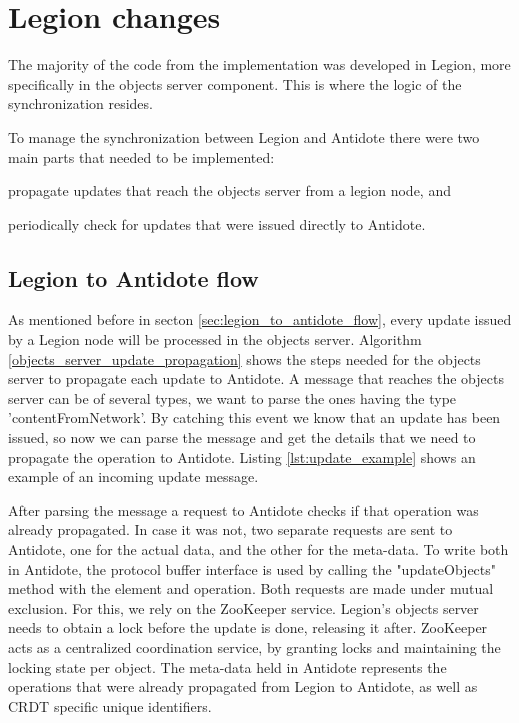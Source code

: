 \section{Legion changes}
\label{sec:legion_changes}
The majority of the code from the implementation was developed in Legion, more specifically in the objects server component. This is where the logic of the synchronization resides.\par
	To manage the synchronization between Legion and Antidote there were two main parts that needed to be implemented: 
\begin{enumerate*}[(i)]
\item propagate updates that reach the objects server from a legion node, and 
\item periodically check for updates that were issued directly to Antidote.
\end{enumerate*}

\subsection{Legion to Antidote flow}
\label{sec:legion_changes_legion_to_antidote_flow}
As mentioned before in secton \ref{sec:legion_to_antidote_flow}, every update issued by a Legion node will be processed in the objects server. Algorithm \ref{objects_server_update_propagation} shows the steps needed for the objects server to propagate each update to Antidote. A message that reaches the objects server can be of several types, we want to parse the ones having the type 'contentFromNetwork'. By catching this event we know that an update has been issued, so now we can parse the message and get the details that we need to propagate the operation to Antidote. Listing \ref{lst:update_example} shows an example of an incoming update message.\par
	After parsing the message a request to Antidote checks if that operation was already propagated. In case it was not, two separate requests are sent to Antidote, one for the actual data, and the other for the meta-data. To write both in Antidote, the protocol buffer interface is used by calling the "updateObjects" method with the element and operation. Both requests are made under mutual exclusion. For this, we rely on the ZooKeeper service. Legion's objects server needs to obtain a lock before the update is done, releasing it after. ZooKeeper acts as a centralized coordination service, by granting locks and maintaining the locking state per object. The meta-data held in Antidote represents the operations that were already propagated from Legion to Antidote, as well as CRDT specific unique identifiers.
	

